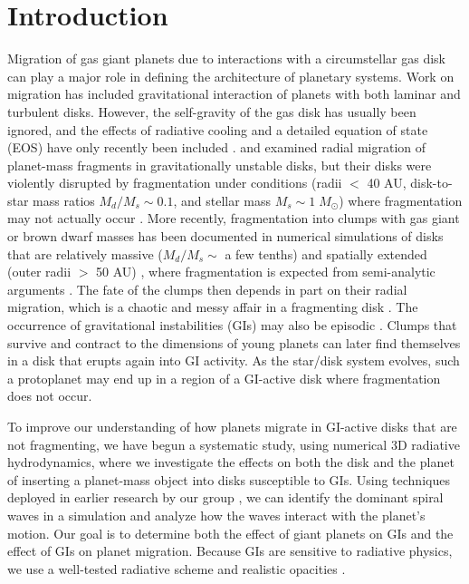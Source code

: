 \documentclass[12pt,manuscript,authoryear]{aastex}
\begin{document}
\label{firstpage}

\section{Introduction}

Migration of gas giant planets due to interactions with a circumstellar gas disk can play a major role in defining the architecture of planetary systems. Work on migration \citep[see review by][]{papaloizou2007} has included gravitational interaction of planets with both laminar and turbulent disks. However,  the self-gravity of the gas disk has usually been ignored, and the effects of radiative cooling and a detailed equation of state (EOS) have only recently been included \citep[e.g.,][]{paardekooper2006,paardekooper2010,paardekooper2010b}. 
\citet{boss2005} and \citet{mayer2004} examined radial migration of planet-mass fragments in gravitationally unstable disks, but their disks were violently disrupted by fragmentation under conditions (radii $<$ 40 AU, disk-to-star mass ratios $M_d/M_s \sim 0.1$, and stellar mass $M_s \sim 1\;M_{\odot}$) where fragmentation may not actually occur  \citep{rafikov2005,rafikov2007,boley2006,boley2007b,boley2008,forgan2009,cai2010}. More recently, fragmentation into clumps with gas giant or brown dwarf masses has been documented in numerical simulations of disks that are relatively massive ($M_d/M_s \sim$ a few tenths) and spatially extended (outer radii $>$ 50 AU) \citep{krumholz2007,stamatellos2007,stamatellos2009,boley2009,boley2010}, where fragmentation is expected from semi-analytic arguments \citep[e.g.,][]{clarke2009,rafikov2009,dodson2009}. The fate of the clumps then depends in part on their radial migration, which is a chaotic and messy affair in a fragmenting disk \citep[e.g.,][]{boley2009,boley2010,vorobyov2010,boleydurisen2010}. The occurrence of gravitational instabilities (GIs) may also be episodic \citep[e.g.,][]{vorobyov2006,vorobyov2010b,zhu2010}. Clumps that survive and contract to the dimensions of young planets can later find themselves in a disk that erupts again into GI activity. As the star/disk system evolves, such a protoplanet may end up in a region of a GI-active disk where fragmentation does not occur.

To improve our understanding of how planets migrate in GI-active disks that are not fragmenting, we have begun a systematic study, using numerical 3D radiative hydrodynamics, where we investigate the effects on both the disk and the planet of inserting a planet-mass object into disks susceptible to GIs. Using techniques deployed in earlier research by our group \citep{pickett2003, mejia2005,cai2006,cai2008,boley2006,boley2007b,michael2010}, we can identify the dominant spiral waves in a simulation and analyze how the waves interact with the planet's motion. Our goal is to determine both the effect of giant planets on GIs and the effect of GIs on planet migration. Because GIs are sensitive to radiative physics, we use a well-tested radiative scheme \citep{boley2007b} and realistic opacities \citep{dalessio2001}. 
\end{document}
